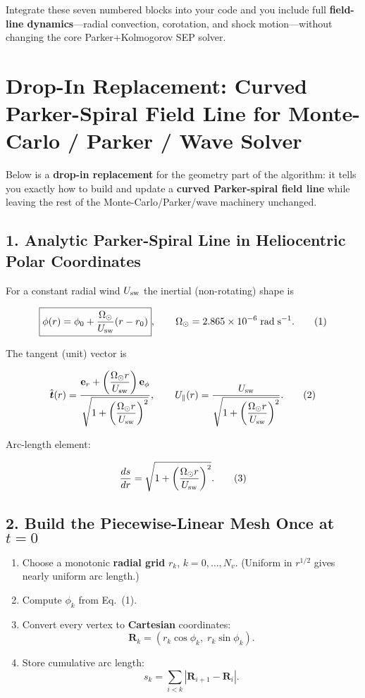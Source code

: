 \noindent
Integrate these seven numbered blocks into your code and you include full \textbf{field-line dynamics}—radial convection, corotation, and shock motion—without changing the core Parker+Kolmogorov SEP solver.


\section*{Drop-In Replacement: Curved Parker-Spiral Field Line for Monte-Carlo / Parker / Wave Solver}

Below is a \textbf{drop-in replacement} for the geometry part of the algorithm: it tells you exactly how to build and update a \textbf{curved Parker-spiral field line} while leaving the rest of the Monte-Carlo/Parker/wave machinery unchanged.

\subsection*{1. Analytic Parker-Spiral Line in Heliocentric Polar Coordinates}

For a constant radial wind $U_{\rm sw}$ the inertial (non-rotating) shape is

\[
\boxed{
\phi(r) = \phi_0 + \frac{\Omega_\odot}{U_{\rm sw}} (r - r_0)
}, \qquad
\Omega_\odot = 2.865 \times 10^{-6} \; {\rm rad\;s^{-1}}. \tag{1}
\]

The tangent (unit) vector is

\[
\hat{\boldsymbol{t}}(r) =
\frac{\mathbf{e}_r + \left( \dfrac{\Omega_\odot r}{U_{\rm sw}} \right) \mathbf{e}_\phi}
{\sqrt{1 + \left( \dfrac{\Omega_\odot r}{U_{\rm sw}} \right)^2 }},
\qquad
U_{\parallel}(r) = \frac{U_{\rm sw}}{\sqrt{1 + \left( \dfrac{\Omega_\odot r}{U_{\rm sw}} \right)^2 }}. \tag{2}
\]

Arc-length element:

\[
\frac{ds}{dr} = \sqrt{1 + \left( \frac{\Omega_\odot r}{U_{\rm sw}} \right)^2 }. \tag{3}
\]

\subsection*{2. Build the Piecewise-Linear Mesh Once at $t=0$}

\begin{enumerate}
    \item Choose a monotonic \textbf{radial grid} $r_k$, $k = 0, \ldots, N_v$.
    (Uniform in $r^{1/2}$ gives nearly uniform arc length.)
    \item Compute $\phi_k$ from Eq.~(1).
    \item Convert every vertex to \textbf{Cartesian} coordinates:
    \[
    \mathbf{R}_k = (r_k \cos \phi_k, \; r_k \sin \phi_k).
    \]
    \item Store cumulative arc length:
    \[
    s_k = \sum_{i<k} \left| \mathbf{R}_{i+1} - \mathbf{R}_i \right|.
    \]
\end{enumerate}

